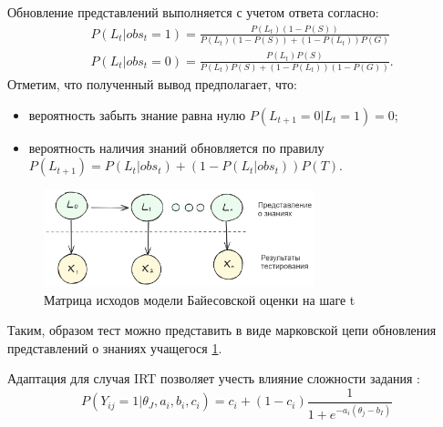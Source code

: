 Обновление представлений выполняется с учетом ответа согласно:
\begin{equation}
    \begin{aligned}
        &P(L_t| obs_t=1) = \frac{P(L_t)(1-P(S))}{P(L_t)(1-P(S)) + (1-P(L_t))P(G)} \\
        &P(L_t| obs_t=0) = \frac{P(L_t)P(S)}{P(L_t) P(S) + (1-P(L_t))(1-P(G))}.
    \end{aligned}
\end{equation}
Отметим, что полученный вывод предполагает, что:
\begin{itemize}
    \item вероятность забыть знание равна нулю $ P(L_{t+1}=0|L_t=1)=0$;
    \item вероятность наличия знаний обновляется по правилу $P(L_{t+1}) = P(L_t|obs_t) + \left(1 - P(L_t | obs_t)\right) P(T)$.
\end{itemize}
\begin{figure}[h]
    \centering
    \includegraphics[width=0.7\textwidth]{assets/pedagogic/social/bkt_automata.excalidraw.png}
    \caption{Матрица исходов модели Байесовской оценки на шаге t}
    \label{bkt_automata}
\end{figure}
Таким, образом тест можно представить в виде марковской цепи обновления представлений о знаниях учащегося \ref{bkt_automata}.

Адаптация для случая IRT позволяет учесть влияние сложности задания \cite{bulut2023introduction}:
\begin{equation}
    P(Y_{ij}=1| \theta_J, a_i,b_i,c_i) = c_i + (1 -c_i) \frac{1}{1+e^{-a_i(\theta_j -b_I)}}
\end{equation}
